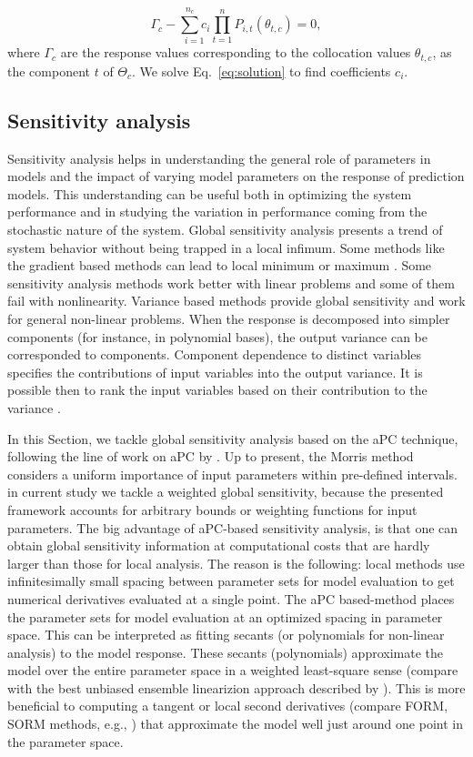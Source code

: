 \begin{equation}
 \Gamma_{c}-\underset{i=1}{\overset{n_c}{\sum}c_{i}}\underset{t=1}{\overset{n}{\prod}}P_{i,t}(\theta_{t,c})=0, \label{eq:solution}
\end{equation}
 where $\Gamma_c$ are the response values corresponding to the collocation values $\theta_{t,c}$, as the component $t$ of $\Theta_{c}$. We solve Eq.~\ref{eq:solution} to find coefficients $c_i$.

\subsection{Sensitivity analysis}
\label{Section:SA}
Sensitivity analysis helps in understanding the general role of parameters in models and the impact of varying model parameters on the response of prediction models. This understanding can be useful both in optimizing the system performance and in studying the variation in performance coming from the stochastic nature of the system. Global sensitivity analysis presents a trend of system behavior without being trapped in a local infimum. Some methods like the gradient based methods can lead to local minimum or maximum \cite{saltelli2007global}. Some sensitivity analysis methods work better with linear problems and some of them fail with nonlinearity. Variance based methods provide global sensitivity and work for general non-linear problems. When the response is decomposed into simpler components (for instance, in polynomial bases), the output variance can be corresponded to components. Component dependence to distinct variables specifies the contributions of input variables into the output variance. It is possible then to rank the input variables based on their contribution to the variance \cite{saltelli2007global,reuter2008global}.

In this Section, we tackle global sensitivity analysis based on the aPC technique, following the line of work on aPC by \cite{oladyshkin2011concept, OladNowakBarros_AWR2011}. Up to present, the Morris method \cite{Morris1991} considers a uniform importance of input parameters within pre-defined intervals. in current study we tackle a weighted global sensitivity, because the presented framework accounts for arbitrary bounds or weighting functions for input parameters.  The big advantage of aPC-based sensitivity analysis, is that one can obtain global sensitivity information at computational costs that are hardly larger than those for local analysis. The reason is the following: local methods use infinitesimally small spacing between parameter sets for model evaluation to get numerical derivatives evaluated at a single point. The aPC based-method places the parameter sets for model evaluation at an optimized spacing in parameter space. This can be interpreted as fitting secants (or polynomials for non-linear analysis) to the model response. These secants (polynomials) approximate the model over the entire parameter space in a weighted least-square sense (compare with the best unbiased ensemble linearizion approach described by \cite{Nowak_2009_BUEL}). This is more beneficial to computing a tangent or local second derivatives (compare FORM, SORM methods, e.g., \cite{Jang1994}) that approximate the model well just around one point in the parameter space.

